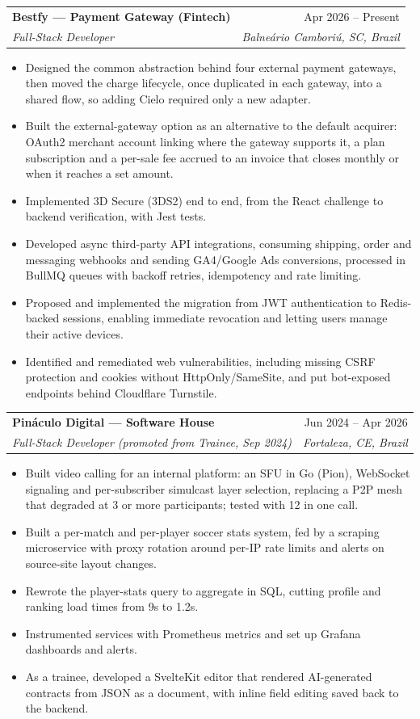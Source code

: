 \documentclass[letterpaper,11pt]{article}
\makeatletter
\newcommand{\resumeItem}[1]{
  \item\small{#1\vspace{-2pt}}
}
\newcommand{\resumeSubheading}[4]{
  \vspace{-2pt}\item
    \begin{tabular*}{0.97\textwidth}[t]{l@{\extracolsep{\fill}}r}
      \textbf{#1} & \small #2 \\
      \textit{\small#3} & \textit{\small #4} \\
    \end{tabular*}\vspace{-7pt}
}
\newcommand{\resumeItemListStart}{\begin{itemize}}
\newcommand{\resumeItemListEnd}{\end{itemize}\vspace{-5pt}}
\makeatother
\begin{document}
  \resumeSubheading
    {Bestfy --- Payment Gateway (Fintech)}{Apr 2026 -- Present}
    {Full-Stack Developer}{Balneário Camboriú, SC, Brazil}
    \resumeItemListStart
      \resumeItem{Designed the common abstraction behind four external payment gateways, then moved the charge lifecycle, once duplicated in each gateway, into a shared flow, so adding Cielo required only a new adapter.}
      \resumeItem{Built the external-gateway option as an alternative to the default acquirer: OAuth2 merchant account linking where the gateway supports it, a plan subscription and a per-sale fee accrued to an invoice that closes monthly or when it reaches a set amount.}
      \resumeItem{Implemented 3D Secure (3DS2) end to end, from the React challenge to backend verification, with Jest tests.}
      \resumeItem{Developed async third-party API integrations, consuming shipping, order and messaging webhooks and sending GA4/Google Ads conversions, processed in BullMQ queues with backoff retries, idempotency and rate limiting.}
      \resumeItem{Proposed and implemented the migration from JWT authentication to Redis-backed sessions, enabling immediate revocation and letting users manage their active devices.}
      \resumeItem{Identified and remediated web vulnerabilities, including missing CSRF protection and cookies without HttpOnly/SameSite, and put bot-exposed endpoints behind Cloudflare Turnstile.}
    \resumeItemListEnd

  \resumeSubheading
    {Pináculo Digital --- Software House}{Jun 2024 -- Apr 2026}
    {Full-Stack Developer (promoted from Trainee, Sep 2024)}{Fortaleza, CE, Brazil}
    \resumeItemListStart
      \resumeItem{Built video calling for an internal platform: an SFU in
        Go (Pion), WebSocket signaling and per-subscriber simulcast layer selection, replacing
        a P2P mesh that degraded at 3 or more participants; tested with 12 in one call.}
      \resumeItem{Built a per-match and per-player soccer stats system, fed by a scraping microservice
        with proxy rotation around per-IP rate limits and alerts on source-site layout changes.}
      \resumeItem{Rewrote the player-stats query to aggregate in SQL, cutting profile and ranking
        load times from 9s to 1.2s.}
      \resumeItem{Instrumented services with Prometheus metrics and set up Grafana dashboards and alerts.}
      \resumeItem{As a trainee, developed a SvelteKit editor that rendered AI-generated contracts from JSON as a document, with inline field editing saved back to the backend.}
    \resumeItemListEnd
\end{document}
